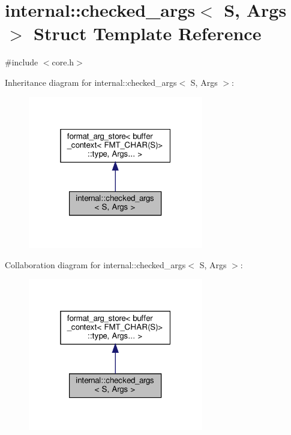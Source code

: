 \hypertarget{structinternal_1_1checked__args}{}\section{internal\+:\+:checked\+\_\+args$<$ S, Args $>$ Struct Template Reference}
\label{structinternal_1_1checked__args}


{\ttfamily \#include $<$core.\+h$>$}



Inheritance diagram for internal\+:\+:checked\+\_\+args$<$ S, Args $>$\+:
\nopagebreak
\begin{figure}[H]
\begin{center}
\leavevmode
\includegraphics[width=217pt]{structinternal_1_1checked__args__inherit__graph}
\end{center}
\end{figure}


Collaboration diagram for internal\+:\+:checked\+\_\+args$<$ S, Args $>$\+:
\nopagebreak
\begin{figure}[H]
\begin{center}
\leavevmode
\includegraphics[width=217pt]{structinternal_1_1checked__args__coll__graph}
\end{center}
\end{figure}
